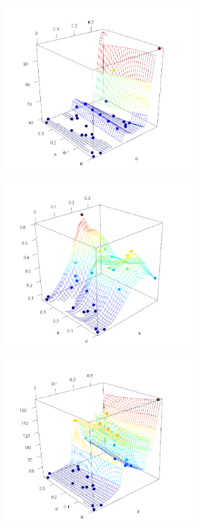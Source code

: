 \documentclass[authoryear]{article}
\begin{document}
\begin{figure}[h!]
\begin{minipage}[b]{.5\linewidth}
\centering\large  
  \includegraphics[width=7cm]{Figures/SensExitPeriod.png}
  \label{Fig:SensExitPeriod}
\end{minipage}
\quad \quad
\begin{minipage}[b]{.5\linewidth}
\centering\large 
    \includegraphics[width=7cm]{Figures/SensOutputVolatility.png}
    \label{Fig:SensOutputVol}
\end{minipage}
\vspace{0.2cm}
    \begin{minipage}[b]{.5\linewidth}
\centering\large 
    \includegraphics[width=7cm]{Figures/SensPhysicalStranded.png}

\end{minipage}
\end{figure}
\end{document}
